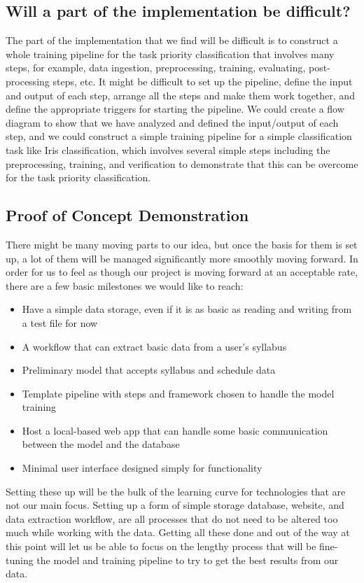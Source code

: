 \documentclass{article}
\begin{document}
    \subsection*{Will a part of the implementation be difficult?} 
    The part of the implementation that we find will be difficult is to construct a whole training pipeline for the task priority classification that involves many steps, for example, data ingestion, preprocessing, training, evaluating, post-processing steps, etc. It might be difficult to set up the pipeline, define the input and output of each step, arrange all the steps and make them work together, and define the appropriate triggers for starting the pipeline. We could create a flow diagram to show that we have analyzed and defined the input/output of each step, and we could construct a simple training pipeline for a simple classification task like Iris classification, which involves several simple steps including the preprocessing, training, and verification to demonstrate that this can be overcome for the task priority classification.

    \subsection*{Proof of Concept Demonstration}
    There might be many moving parts to our idea, but once the basis for them is set up, a lot of them will be managed significantly more smoothly moving forward. In order for us to feel as though our project is moving forward at an acceptable rate, there are a few basic milestones we would like to reach:

    \begin{itemize}
        \item Have a simple data storage, even if it is as basic as reading and writing from a test file for now
        \item A workflow that can extract basic data from a user's syllabus
        \item Preliminary model that accepts syllabus and schedule data
        \item Template pipeline with steps and framework chosen to handle the model training
        \item Host a local-based web app that can handle some basic communication between the model and the database 
        \item Minimal user interface designed simply for functionality
    \end{itemize}
    Setting these up will be the bulk of the learning curve for technologies that are not our main focus. Setting up a form of simple storage database, website, and data extraction workflow, are all processes that do not need to be altered too much while working with the data. Getting all these done and out of the way at this point will let us be able to focus on the lengthy process that will be fine-tuning the model and training pipeline to try to get the best results from our data.
\end{document}
